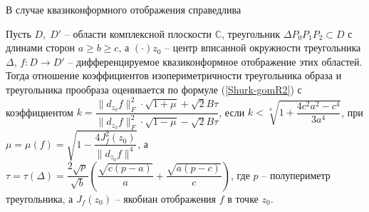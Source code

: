 \documentclass[a4paper,11pt,twoside]{article}
\begin{document}
В случае квазиконформного отображения справедлива 
\begin{thm}
Пусть $D, \; D'$ -- области комплексной плоскости $\mathbb{C}$, треугольник $\Delta P_0P_1P_2 \subset D$ с длинами сторон $a \geqslant b \geqslant c$, а $(\cdot) z_0 $ -- центр вписанной окружности треугольника %
$ \Delta $, $ f:D\rightarrow D'$ -- дифференцируемое квазиконформное  отображение этих областей.
Тогда отношение коэффициентов изопериметричности треугольника образа и треугольника прообраза оценивается по формуле (\ref{Shurk-gomR2}) с коэффициентом $k=\dfrac{\|d_{z_0}f\|_F^2 \cdot \sqrt{1+\mu}+\sqrt{2} B \tau}{\|d_{z_0}f\|_F^2 \cdot \sqrt{1-\mu}-\sqrt{2} B \tau}$, если $k<\sqrt[4]{1+\dfrac{4c^2a^2-c^4}{3a^4}}$, при $\mu=\mu(f)=\sqrt{1-\dfrac{4 J_f^2(z_0)}{\|d_{z_0}f\|^4}}$, а $\tau=\tau(\Delta)=\dfrac{2 \sqrt{p}}{\sqrt{b}}\left( \dfrac{\sqrt{c(p-a)}}{a} + \dfrac{\sqrt{a(p-c)}}{c} \right)$, где $p$ -- полупериметр треугольника, а $J_f(z_0)$ -- якобиан отображения $f$ в точке $z_0$.
\end{thm}
\end{document}
